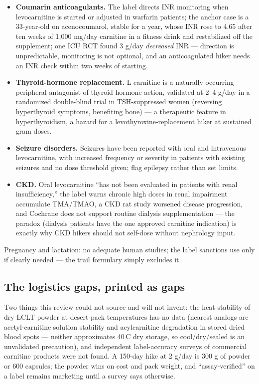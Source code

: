 \begin{itemize}[leftmargin=1.4em]
\item \textbf{Coumarin anticoagulants.} The label directs INR monitoring when levocarnitine is started or adjusted in warfarin patients; the anchor case is a 33-year-old on acenocoumarol, stable for a year, whose INR rose to 4.65 after ten weeks of 1{,}000 mg/day carnitine in a fitness drink and restabilized off the supplement; one ICU RCT found 3 g/day \emph{decreased} INR --- direction is unpredictable, monitoring is not optional, and an anticoagulated hiker needs an INR check within two weeks of starting.
\item \textbf{Thyroid-hormone replacement.} L-carnitine is a naturally occurring peripheral antagonist of thyroid hormone action, validated at 2--4 g/day in a randomized double-blind trial in TSH-suppressed women (reversing hyperthyroid symptoms, benefiting bone) --- a therapeutic feature in hyperthyroidism, a hazard for a levothyroxine-replacement hiker at sustained gram doses.
\item \textbf{Seizure disorders.} Seizures have been reported with oral and intravenous levocarnitine, with increased frequency or severity in patients with existing seizures and no dose threshold given; flag epilepsy rather than set limits.
\item \textbf{CKD.} Oral levocarnitine ``has not been evaluated in patients with renal insufficiency,'' the label warns chronic high doses in renal impairment accumulate TMA/TMAO, a CKD rat study worsened disease progression, and Cochrane does not support routine dialysis supplementation --- the paradox (dialysis patients have the one approved carnitine indication) is exactly why CKD hikers should not self-dose without nephrology input.
\end{itemize}

Pregnancy and lactation: no adequate human studies; the label sanctions use only if clearly needed --- the trail formulary simply excludes it.

\subsection{The logistics gaps, printed as gaps}

Two things this review could not source and will not invent: the heat stability of dry LCLT powder at desert pack temperatures has no data (nearest analogs are acetyl-carnitine solution stability and acylcarnitine degradation in stored dried blood spots --- neither approximates 40\,\textdegree C dry storage, so cool/dry/sealed is an unvalidated precaution), and independent label-accuracy surveys of commercial carnitine products were not found. A 150-day hike at 2 g/day is 300 g of powder or 600 capsules; the powder wins on cost and pack weight, and ``assay-verified'' on a label remains marketing until a survey says otherwise.

